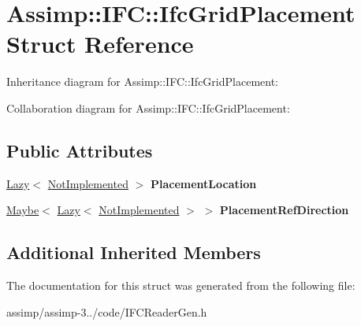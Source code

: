 \hypertarget{struct_assimp_1_1_i_f_c_1_1_ifc_grid_placement}{\section{Assimp\+:\+:I\+F\+C\+:\+:Ifc\+Grid\+Placement Struct Reference}
\label{struct_assimp_1_1_i_f_c_1_1_ifc_grid_placement}
}


Inheritance diagram for Assimp\+:\+:I\+F\+C\+:\+:Ifc\+Grid\+Placement\+:


Collaboration diagram for Assimp\+:\+:I\+F\+C\+:\+:Ifc\+Grid\+Placement\+:
\subsection*{Public Attributes}
\begin{DoxyCompactItemize}
\item 
\hypertarget{struct_assimp_1_1_i_f_c_1_1_ifc_grid_placement_abe4717f43d5527b0450571c85ba3fa65}{\hyperlink{struct_assimp_1_1_s_t_e_p_1_1_lazy}{Lazy}$<$ \hyperlink{struct_assimp_1_1_i_f_c_1_1_not_implemented}{Not\+Implemented} $>$ {\bfseries Placement\+Location}}\label{struct_assimp_1_1_i_f_c_1_1_ifc_grid_placement_abe4717f43d5527b0450571c85ba3fa65}

\item 
\hypertarget{struct_assimp_1_1_i_f_c_1_1_ifc_grid_placement_a37251adb58b17711d0aca5e6f9951283}{\hyperlink{struct_assimp_1_1_s_t_e_p_1_1_maybe}{Maybe}$<$ \hyperlink{struct_assimp_1_1_s_t_e_p_1_1_lazy}{Lazy}$<$ \hyperlink{struct_assimp_1_1_i_f_c_1_1_not_implemented}{Not\+Implemented} $>$ $>$ {\bfseries Placement\+Ref\+Direction}}\label{struct_assimp_1_1_i_f_c_1_1_ifc_grid_placement_a37251adb58b17711d0aca5e6f9951283}

\end{DoxyCompactItemize}
\subsection*{Additional Inherited Members}


The documentation for this struct was generated from the following file\+:\begin{DoxyCompactItemize}
\item 
assimp/assimp-\/3../code/I\+F\+C\+Reader\+Gen.\+h\end{DoxyCompactItemize}
